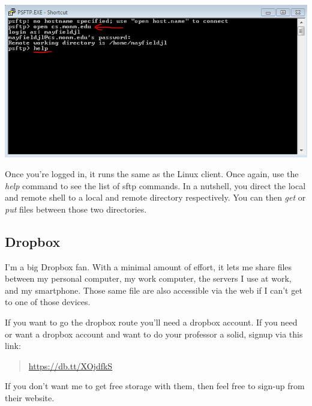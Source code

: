 \documentclass[]{tufte-handout}
\begin{document}
\vspace{.1in}
\begin{center}
\includegraphics[scale=.75]{PSFTP-loginAndHelp.png}
\end{center}
\vspace{.1in}

Once you're logged in, it runs the same as the Linux client. Once again, use the \textit{help} command to see the list of sftp commands. In a nutshell, you direct the local and remote shell to a local and remote directory respectively. You can then \textit{get} or \textit{put} files between those two directories. 

\subsection{Dropbox}

I'm a big Dropbox fan. With a minimal amount of effort, it lets me share files between my personal computer, my work computer, the servers I use at work, and my smartphone.  Those same file are also accessible via the web if I can't get to one of those devices.

If you want to go the dropbox route you'll need a dropbox account. If you need or want a dropbox account and want to do your professor a solid, signup via this link:
\begin{quote}
\url{https://db.tt/XOjdfkS}
\end{quote}
If you don't want me to get free storage with them, then feel free to sign-up from their website. 
\end{document}
